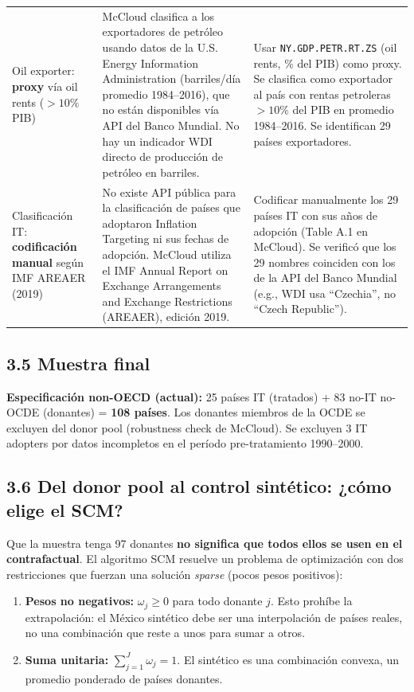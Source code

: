\documentclass[11pt,a4paper]{article}
\begin{document}
\begin{table}[H]
\begin{tabularx}{\textwidth}{@{} p{2.8cm} p{4.2cm} X @{}}
Oil exporter: \textbf{proxy} vía oil rents ($> 10\%$ PIB)
    & McCloud clasifica a los exportadores de petróleo usando datos de la U.S. Energy Information Administration (barriles/día promedio 1984–2016), que no están disponibles vía API del Banco Mundial. No hay un indicador WDI directo de producción de petróleo en barriles.
    & Usar \texttt{NY.GDP.PETR.RT.ZS} (oil rents, \% del PIB) como proxy. Se clasifica como exportador al país con rentas petroleras $> 10\%$ del PIB en promedio 1984–2016. Se identifican 29 países exportadores. \\

Clasificación IT: \textbf{codificación manual} según IMF AREAER (2019)
    & No existe API pública para la clasificación de países que adoptaron Inflation Targeting ni sus fechas de adopción. McCloud utiliza el IMF Annual Report on Exchange Arrangements and Exchange Restrictions (AREAER), edición 2019.
    & Codificar manualmente los 29 países IT con sus años de adopción (Table A.1 en McCloud). Se verificó que los 29 nombres coinciden con los de la API del Banco Mundial (e.g., WDI usa ``Czechia'', no ``Czech Republic''). \\
\bottomrule
\end{tabularx}
\end{table}

\subsection*{3.5 Muestra final}

\textbf{Especificación non-OECD (actual):} 25 países IT (tratados) + 83 no-IT no-OCDE (donantes) = \textbf{108 países}. Los donantes miembros de la OCDE se excluyen del donor pool (robustness check de McCloud). Se excluyen 3 IT adopters por datos incompletos en el período pre-tratamiento 1990–2000.

\subsection*{3.6 Del donor pool al control sintético: ¿cómo elige el SCM?}

Que la muestra tenga 97 donantes \textbf{no significa que todos ellos se usen en el contrafactual}. El algoritmo SCM resuelve un problema de optimización con dos restricciones que fuerzan una solución \textit{sparse} (pocos pesos positivos):

\begin{enumerate}[nosep]
    \item \textbf{Pesos no negativos:} $\omega_j \geq 0$ para todo donante $j$. Esto prohíbe la extrapolación: el México sintético debe ser una interpolación de países reales, no una combinación que reste a unos para sumar a otros.
    \item \textbf{Suma unitaria:} $\sum_{j=1}^{J} \omega_j = 1$. El sintético es una combinación convexa, un promedio ponderado de países donantes.
\end{enumerate}
\end{document}
